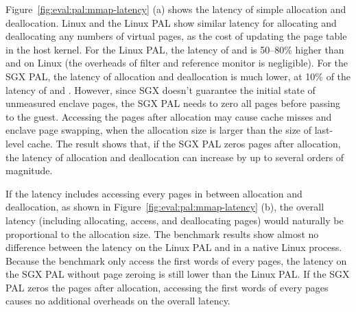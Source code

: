 Figure~\ref{fig:eval:pal:mmap-latency} (a)
shows the latency of
simple allocation and deallocation.
Linux and the Linux PAL
show similar latency for allocating and deallocating any numbers
of virtual pages,
as the cost of updating the page table
in the host kernel.
For the Linux PAL, the latency
of  and   is 50--80\% higher
than  and  on Linux
(the overheads of \seccomp{} filter and reference monitor is negligible).
For the SGX PAL,
the latency of allocation and deallocation
is much lower,
at \roughly{}10\% of the latency of  and .
However,
since SGX doesn't guarantee the initial state of unmeasured enclave pages,
the SGX PAL needs to zero all pages
before passing to the guest.
Accessing the pages after allocation
may cause cache misses and enclave page swapping,
when the allocation size
is larger than the size of last-level cache.
The result shows that,
if the SGX PAL zeros pages after allocation,
the latency of allocation and deallocation can increase by up to several orders of magnitude.



If the latency includes accessing every pages in between allocation and deallocation,
as shown in Figure~\ref{fig:eval:pal:mmap-latency} (b),
the overall latency (including allocating, access, and deallocating pages) would
naturally be proportional to the allocation size.
The benchmark results show almost no difference
between the latency on the Linux PAL and in a native Linux process.
Because the benchmark only access the first words
of every pages,
the latency on the SGX PAL without page zeroing
is still lower than the Linux PAL.
If the SGX PAL zeros the pages after allocation,
accessing the first words
of every pages causes no additional overheads
on the overall latency.




